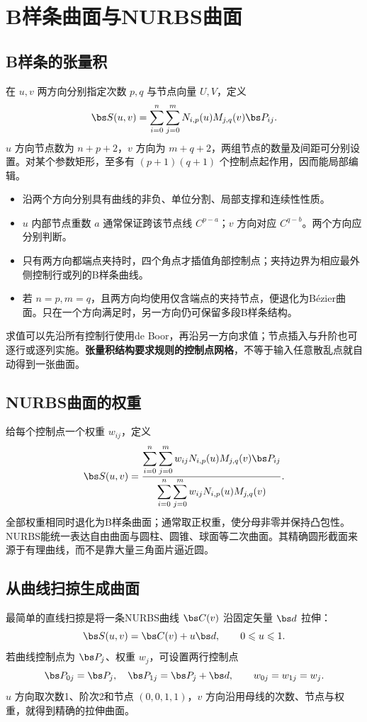 \section{B样条曲面与NURBS曲面}

\subsection{B样条的张量积}
在 $u,v$ 两方向分别指定次数 $p,q$ 与节点向量 $U,V$，定义
\[
 \bs S(u,v)=\sum_{i=0}^n\sum_{j=0}^m
 N_{i,p}(u)M_{j,q}(v)\bs P_{ij}.
\]
$u$ 方向节点数为 $n+p+2$，$v$ 方向为 $m+q+2$，两组节点的数量及间距可分别设置。对某个参数矩形，至多有 $(p+1)(q+1)$ 个控制点起作用，因而能局部编辑。

\begin{itemize}
 \item 沿两个方向分别具有曲线的非负、单位分割、局部支撑和连续性性质。
 \item $u$ 内部节点重数 $a$ 通常保证跨该节点线 $C^{p-a}$；$v$ 方向对应 $C^{q-b}$。两个方向应分别判断。
 \item 只有两方向都端点夹持时，四个角点才插值角部控制点；夹持边界为相应最外侧控制行或列的B样条曲线。
 \item 若 $n=p,m=q$，且两方向均使用仅含端点的夹持节点，便退化为Bézier曲面。只在一个方向满足时，另一方向仍可保留多段B样条结构。
\end{itemize}
求值可以先沿所有控制行使用de Boor，再沿另一方向求值；节点插入与升阶也可逐行或逐列实施。\textbf{张量积结构要求规则的控制点网格}，不等于输入任意散乱点就自动得到一张曲面。

\subsection{NURBS曲面的权重}
给每个控制点一个权重 $w_{ij}$，定义
\[
 \bs S(u,v)=
 \frac{\displaystyle\sum_{i=0}^n\sum_{j=0}^m
       w_{ij}N_{i,p}(u)M_{j,q}(v)\bs P_{ij}}
      {\displaystyle\sum_{i=0}^n\sum_{j=0}^m
       w_{ij}N_{i,p}(u)M_{j,q}(v)}.
\]
全部权重相同时退化为B样条曲面；通常取正权重，使分母非零并保持凸包性。NURBS能统一表达自由曲面与圆柱、圆锥、球面等二次曲面。其精确圆形截面来源于有理曲线，而不是靠大量三角面片逼近圆。

\subsection{从曲线扫掠生成曲面}
最简单的直线扫掠是将一条NURBS曲线 $\bs C(v)$ 沿固定矢量 $\bs d$ 拉伸：
\[
 \bs S(u,v)=\bs C(v)+u\bs d,\qquad0\leq u\leq1.
\]
若曲线控制点为 $\bs P_j$、权重 $w_j$，可设置两行控制点
\[
 \bs P_{0j}=\bs P_j,\quad\bs P_{1j}=\bs P_j+\bs d,
 \qquad w_{0j}=w_{1j}=w_j.
\]
$u$ 方向取次数1、阶次2和节点 $(0,0,1,1)$，$v$ 方向沿用母线的次数、节点与权重，就得到精确的拉伸曲面。

